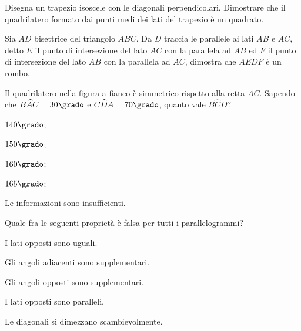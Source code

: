 \begin{multicols}{2}
\begin{esercizio}
\label{ese:4.58}
Disegna un trapezio isoscele con le diagonali perpendicolari. 
Dimostrare che il quadrilatero formato dai punti medi dei lati del 
trapezio è un quadrato.
\end{esercizio}

\begin{esercizio}
\label{ese:4.59}
Sia \(AD\) bisettrice del triangolo \(ABC\). Da \(D\) traccia le parallele 
ai lati \(AB\) e \(AC\), detto \(E\) il punto di intersezione del lato \(AC\) 
con la parallela ad \(AB\) ed \(F\) il punto di intersezione del lato 
\(AB\) con la parallela ad \(AC\), dimostra che \(AEDF\) è un rombo.
\end{esercizio}

\end{multicols}

\noindent\begin{minipage}{0.6\textwidth}\parindent15pt
\begin{esercizio}
\label{ese:4.60}
Il quadrilatero nella figura a fianco è simmetrico rispetto alla 
retta \(AC\).
Sapendo che \(B\widehat{A}C = 30\grado\) e \(C\widehat{D}A = 70\grado\), 
quanto vale \(B\widehat{C}D\)?
\begin{enumeratea}
\item \(140\grado\);
\item \(150\grado\);
\item \(160\grado\);
\item \(165\grado\);
\item Le informazioni sono insufficienti.
\end{enumeratea}
\end{esercizio}
\end{minipage}\hfil
\begin{minipage}{0.4\textwidth}
	\centering
\end{minipage}

\begin{esercizio}
\label{ese:4.61}
Quale fra le seguenti proprietà è falsa per tutti i parallelogrammi?
\begin{enumeratea}
\item I lati opposti sono uguali.
\item Gli angoli adiacenti sono supplementari.
\item Gli angoli opposti sono supplementari.
\item I lati opposti sono paralleli.
\item Le diagonali si dimezzano scambievolmente.
\end{enumeratea}
\end{esercizio}

